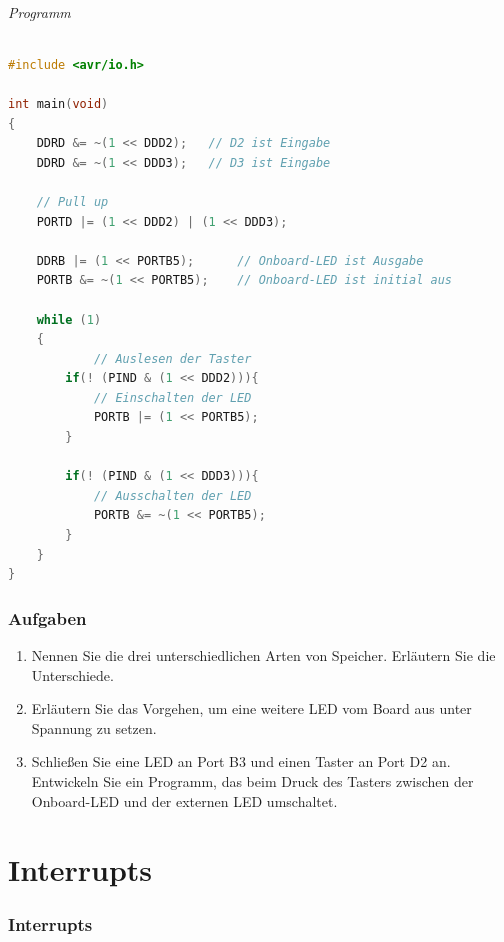 \documentclass[11pt,a4paper]{scrartcl}
\begin{document}
\paragraph{Programm} \quad
\begin{lstlisting}[language=C]
#include <avr/io.h>

int main(void)
{
	DDRD &= ~(1 << DDD2);	// D2 ist Eingabe
	DDRD &= ~(1 << DDD3);	// D3 ist Eingabe
	
	// Pull up
	PORTD |= (1 << DDD2) | (1 << DDD3);
	
	DDRB |= (1 << PORTB5);		// Onboard-LED ist Ausgabe
	PORTB &= ~(1 << PORTB5);	// Onboard-LED ist initial aus
	
    while (1) 
    {
    		// Auslesen der Taster
		if(! (PIND & (1 << DDD2))){
			// Einschalten der LED			
			PORTB |= (1 << PORTB5);
		}
		
		if(! (PIND & (1 << DDD3))){
			// Ausschalten der LED			
			PORTB &= ~(1 << PORTB5);
		}
    }
}

\end{lstlisting}
\section*{Aufgaben}
\begin{enumerate}
\item Nennen Sie die drei unterschiedlichen Arten von Speicher. Erläutern Sie die Unterschiede.
\item Erläutern Sie das Vorgehen, um eine weitere LED vom Board aus unter Spannung zu setzen.
\item Schließen Sie eine LED an Port B3 und einen Taster an Port D2 an. Entwickeln Sie ein Programm, das beim Druck des Tasters zwischen der Onboard-LED und der externen LED umschaltet.
\end{enumerate}
\part{Interrupts}
\section{Interrupts}
\end{document}
